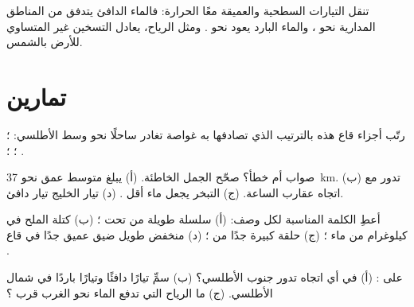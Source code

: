 تنقل التيارات السطحية والعميقة معًا الحرارة: فالماء الدافئ يتدفق من المناطق
المدارية نحو ، والماء البارد يعود نحو . ومثل الرياح، يعادل
 التسخين غير المتساوي للأرض بالشمس.

\section{تمارين}

\begin{exercise}[$\star$]\label{exo:g8:the-oceans:1}
رتّب أجزاء قاع  هذه بالترتيب الذي تصادفها به غواصة تغادر ساحلًا
نحو وسط الأطلسي: ؛ ؛ ؛ .
\end{exercise}

\begin{exercise}[$\star$]\label{exo:g8:the-oceans:2}
صواب أم خطأ؟ صحّح الجمل الخاطئة. (أ) يبلغ متوسط عمق  نحو
\qty{37}{km}. (ب) تدور   مع اتجاه عقارب الساعة. (ج)
التبخر يجعل ماء  أقل . (د) تيار الخليج تيار
دافئ.
\end{exercise}

\begin{exercise}[$\star$]\label{exo:g8:the-oceans:3}
أعطِ الكلمة المناسبة لكل وصف: (أ) سلسلة طويلة من  تحت ؛ (ب)
كتلة الملح في كيلوغرام من ماء ؛ (ج) حلقة كبيرة جدًا من ؛ (د) منخفض طويل ضيق عميق جدًا في قاع
.
\end{exercise}

\begin{exercise}[$\star$]\label{exo:g8:the-oceans:4}
على  : (أ) في أي اتجاه تدور  جنوب الأطلسي؟ (ب) سمِّ تيارًا
دافئًا وتيارًا باردًا في شمال الأطلسي. (ج) ما الرياح التي تدفع الماء نحو
الغرب قرب ؟
\end{exercise}

